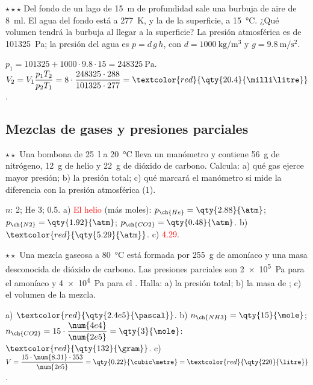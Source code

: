 \begin{exercise}
    \(\star\star\star\) Del fondo de un lago de \qty{15}{\metre} de profundidad sale una burbuja de aire de \qty{8}{\milli\litre}. El agua del fondo está
    a \qty{277}{\kelvin}, y la de la superficie, a \qty{15}{\degreeCelsius}. ¿Qué volumen tendrá la burbuja al llegar a la superficie?
    La presión atmosférica es de \qty{101325}{\pascal}; la presión del agua es \(p = d\,g\,h\), con \(d = \qty{1000}{\kilogram\per\cubic\metre}\) y
    \(g = \qty{9.8}{\metre\per\second\squared}\).
    \begin{solu}
        \(p_1 = 101325 + 1000 \cdot \num{9.8} \cdot 15 = \qty{248325}{\pascal}\).
        \(V_2 = V_1 \dfrac{p_1 T_2}{p_2 T_1} = 8 \cdot \dfrac{248325 \cdot 288}{101325 \cdot 277} = \textcolor{red}{\qty{20.4}{\milli\litre}}\).
    \end{solu}
\end{exercise}

\subsection{Mezclas de gases y presiones parciales}

\begin{exercise}
    \(\star\star\) Una bombona de \qty{25}{\litre} a \qty{20}{\degreeCelsius} lleva un manómetro y contiene \qty{56}{\gram} de nitrógeno,
    \qty{12}{\gram} de helio y \qty{22}{\gram} de dióxido de carbono. Calcula: a) qué gas ejerce mayor presión; b) la presión total; c) qué
    marcará el manómetro si mide la diferencia con la presión atmosférica (\qty{1}{\atm}).
    \begin{solu}
        \(n\):  2; He 3;  \num{0.5}. a) \textcolor{red}{El helio} (más moles): \(p_{\ch{He}} = \qty{2.88}{\atm}\);
        \(p_{\ch{N2}} = \qty{1.92}{\atm}\); \(p_{\ch{CO2}} = \qty{0.48}{\atm}\). b) \(\textcolor{red}{\qty{5.29}{\atm}}\). c) \textcolor{red}{\qty{4.29}{\atm}}.
    \end{solu}
\end{exercise}

\begin{exercise}
    \(\star\star\) Una mezcla gaseosa a \qty{80}{\degreeCelsius} está formada por \qty{255}{\gram} de amoníaco y una masa desconocida de dióxido de
    carbono. Las presiones parciales son \qty{2e5}{\pascal} para el amoníaco y \qty{4e4}{\pascal} para el . Halla: a) la presión total;
    b) la masa de ; c) el volumen de la mezcla.
    \begin{solu}
        a) \(\textcolor{red}{\qty{2.4e5}{\pascal}}\). b) \(n_{\ch{NH3}} = \qty{15}{\mole}\); \(n_{\ch{CO2}} = 15 \cdot \dfrac{\num{4e4}}{\num{2e5}} = \qty{3}{\mole}\):
        \(\textcolor{red}{\qty{132}{\gram}}\). c) \(V = \dfrac{15 \cdot \num{8.31} \cdot 353}{\num{2e5}} = \qty{0.22}{\cubic\metre} = \textcolor{red}{\qty{220}{\litre}}\).
    \end{solu}
\end{exercise}

